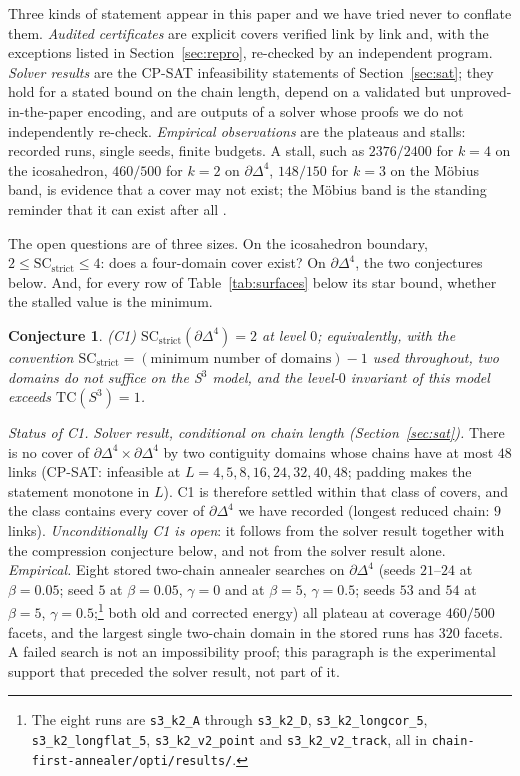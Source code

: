 \documentclass[12pt]{article}
\newcommand{\TC}{\mathrm{TC}}
\newcommand{\SC}{\mathrm{SC}}
\newcommand{\SCst}{\SC_{\mathrm{strict}}}
\newtheorem{conjecture}[theo]{Conjecture}
\begin{document}
Three kinds of statement appear in this paper and we have tried never to
conflate them.  \emph{Audited certificates} are explicit covers verified
link by link and, with the exceptions listed in Section~\ref{sec:repro},
re-checked by an independent program.  \emph{Solver results} are the
CP-SAT infeasibility statements of Section~\ref{sec:sat}; they hold for
a stated bound on the chain length, depend on a validated but
unproved-in-the-paper encoding, and are outputs of a solver whose
proofs we do not independently re-check.  \emph{Empirical observations}
are the plateaus and stalls: recorded runs, single seeds, finite
budgets.  A stall, such as $2376/2400$ for $k=4$ on the icosahedron,
$460/500$ for $k=2$ on $\partial\Delta^4$, $148/150$ for $k=3$ on the
M\"obius band, is evidence that a cover may not exist; the M\"obius
band is the standing reminder that it can exist after all \cite{PM26}.

The open questions are of three sizes.  On the icosahedron boundary,
$2\le\SCst\le4$: does a four-domain cover exist?  On
$\partial\Delta^4$, the two conjectures below.  And, for every row of
Table~\ref{tab:surfaces} below its star bound, whether the stalled value
is the minimum.

\begin{conjecture}\label{conj}
\emph{(C1)} $\SCst(\partial\Delta^4)=2$ at level $0$; equivalently,
with the convention $\SCst=(\text{minimum number of domains})-1$ used
throughout, two domains do not suffice on the S$^3$ model, and the
level-$0$ invariant of this model exceeds $\TC(S^3)=1$.
\end{conjecture}

\noindent\emph{Status of C1.}
\emph{Solver result, conditional on chain length (Section~\ref{sec:sat}).}
There is no cover of $\partial\Delta^4\times\partial\Delta^4$ by two
contiguity domains whose chains have at most $48$ links
(CP-SAT: infeasible at $L=4,5,8,16,24,32,40,48$; padding makes the
statement monotone in $L$).  C1 is therefore settled within that class
of covers, and the class contains every cover of $\partial\Delta^4$ we have
recorded (longest reduced chain: $9$ links).  \emph{Unconditionally C1 is open}:
it follows from the solver result together with the compression
conjecture below, and not from the solver result alone.
\emph{Empirical.}  Eight stored two-chain annealer searches on
$\partial\Delta^4$ (seeds $21$--$24$ at $\beta{=}0.05$; seed $5$ at
$\beta{=}0.05$, $\gamma{=}0$ and at $\beta{=}5$, $\gamma{=}0.5$; seeds
$53$ and $54$ at $\beta{=}5$, $\gamma{=}0.5$;\footnote{The eight runs are
\texttt{s3\_k2\_A} through \texttt{s3\_k2\_D},
\texttt{s3\_k2\_longcor\_5}, \texttt{s3\_k2\_longflat\_5},
\texttt{s3\_k2\_v2\_point} and \texttt{s3\_k2\_v2\_track}, all in
\texttt{chain-first-annealer/opti/results/}.} both old and corrected
energy) all plateau at coverage $460/500$ facets, and the largest
single two-chain domain in the stored runs has $320$ facets.  A failed
search is not an impossibility proof; this paragraph is the experimental
support that preceded the solver result, not part of it.
\end{document}

